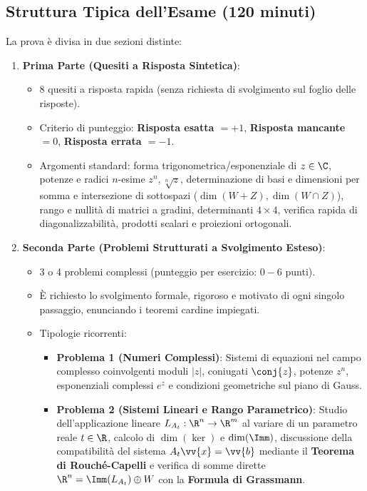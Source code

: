 \subsection{Struttura Tipica dell'Esame (120 minuti)}
La prova è divisa in due sezioni distinte:
\begin{enumerate}
    \item \textbf{Prima Parte (Quesiti a Risposta Sintetica)}:
    \begin{itemize}
        \item 8 quesiti a risposta rapida (senza richiesta di svolgimento sul foglio delle risposte).
        \item Criterio di punteggio: \textbf{Risposta esatta $= +1$}, \textbf{Risposta mancante $= 0$}, \textbf{Risposta errata $= -1$}.
        \item Argomenti standard: forma trigonometrica/esponenziale di $z \in \C$, potenze e radici $n$-esime $z^n, \sqrt[n]{z}$, determinazione di basi e dimensioni per somma e intersezione di sottospazi ($\dim(W+Z), \dim(W \cap Z)$), rango e nullità di matrici a gradini, determinanti $4 \times 4$, verifica rapida di diagonalizzabilità, prodotti scalari e proiezioni ortogonali.
    \end{itemize}
    \item \textbf{Seconda Parte (Problemi Strutturati a Svolgimento Esteso)}:
    \begin{itemize}
        \item 3 o 4 problemi complessi (punteggio per esercizio: $0 - 6$ punti).
        \item È richiesto lo svolgimento formale, rigoroso e motivato di ogni singolo passaggio, enunciando i teoremi cardine impiegati.
        \item Tipologie ricorrenti:
        \begin{itemize}
            \item \textbf{Problema 1 (Numeri Complessi)}: Sistemi di equazioni nel campo complesso coinvolgenti moduli $|z|$, coniugati $\conj{z}$, potenze $z^n$, esponenziali complessi $e^z$ e condizioni geometriche sul piano di Gauss.
            \item \textbf{Problema 2 (Sistemi Lineari e Rango Parametrico)}: Studio dell'applicazione lineare $L_{A_t}: \R^n \to \R^m$ al variare di un parametro reale $t \in \R$, calcolo di $\dim(\ker)$ e $\dim(\Imm)$, discussione della compatibilità del sistema $A_t \vv{x} = \vv{b}$ mediante il \textbf{Teorema di Rouché-Capelli} e verifica di somme dirette $\R^n = \Imm(L_{A_t}) \oplus W$ con la \textbf{Formula di Grassmann}.

\end{itemize}
\end{itemize}
\end{enumerate}
